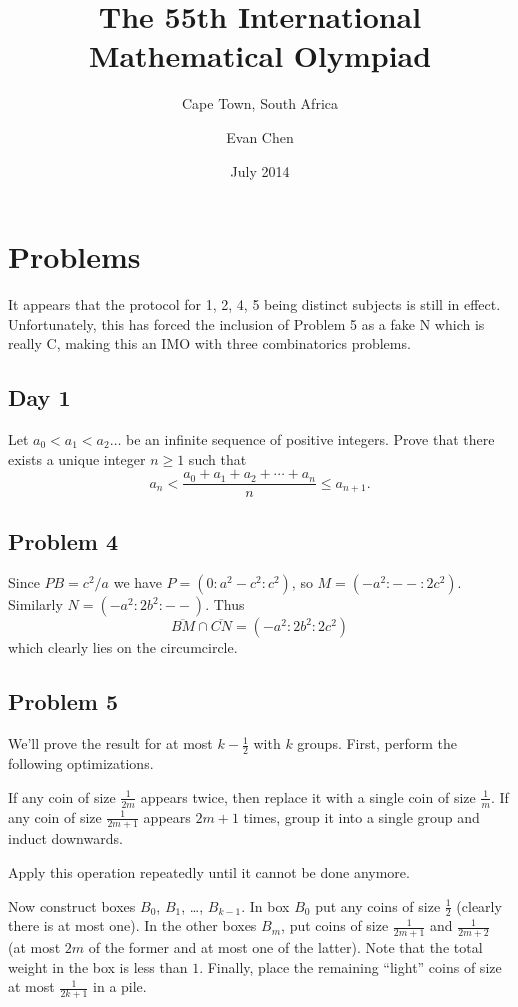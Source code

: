 \documentclass[11pt]{scrreprt}
\numberwithin{figure}{chapter}
\begin{document}
\title{The 55th International Mathematical Olympiad}
\subtitle{Cape Town, South Africa}
\author{Evan Chen}
\date{July 2014}
\maketitle

\tableofcontents

\chapter{Problems}
It appears that the protocol for 1, 2, 4, 5 being distinct subjects is still in effect.
Unfortunately, this has forced the inclusion of Problem 5 as a fake N which is really C, making this an
IMO with three combinatorics problems.
\section{Day 1}
\begin{problem}
  Let $a_0 < a_1 < a_2 \ldots$ be an infinite sequence of positive integers. Prove that there exists a unique integer $n\geq 1$ such that \[a_n < \frac{a_0+a_1+a_2+\cdots+a_n}{n} \leq a_{n+1}.\]
\end{problem}

\section{Problem 4}
Since $PB = c^2/a$ we have $P = (0 : a^2-c^2 : c^2)$, so $M = (-a^2 : {--} : 2c^2)$. Similarly $N = (-a^2 : 2b^2 : {--})$. Thus
\[ \overline{BM} \cap \overline{CN} = (-a^2 : 2b^2 : 2c^2) \]
which clearly lies on the circumcircle.


\section{Problem 5}
We'll prove the result for at most $k - \tfrac 12$ with $k$ groups.
First, perform the following optimizations.
\begin{itemize}
  \ii If any coin of size $\frac{1}{2m}$ appears twice, then replace it with a single coin of size $\frac{1}{m}$.
  \ii If any coin of size $\frac{1}{2m+1}$ appears $2m+1$ times, group it into a single group and induct downwards.
\end{itemize}
Apply this operation repeatedly until it cannot be done anymore.

Now construct boxes $B_0$, $B_1$, \dots, $B_{k-1}$.  In box $B_0$ put any coins of size $\tfrac 12$ (clearly there is at most one).
In the other boxes $B_m$, put coins of size $\frac{1}{2m+1}$ and $\frac{1}{2m+2}$ (at most $2m$ of the former and at most one of the latter).
Note that the total weight in the box is less than $1$.
Finally, place the remaining ``light'' coins of size at most $\frac{1}{2k+1}$ in a pile.
\end{document}
